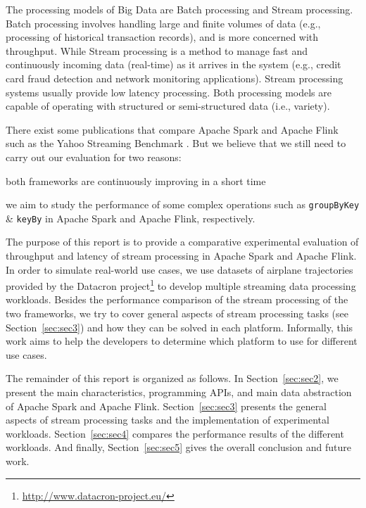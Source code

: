 \documentclass[]{article}
\begin{document}
\par The processing models of Big Data are Batch processing and Stream processing. Batch processing involves handling  large and finite volumes of data (e.g., processing of historical transaction records), and is more concerned with throughput. While Stream processing  is a method to manage fast and continuously incoming data (real-time) as it arrives in the system (e.g., credit card fraud detection and network monitoring applications). Stream processing systems usually  provide low latency processing. Both processing models are capable of operating with structured or semi-structured data (i.e., variety).

\par There exist some publications that compare Apache Spark and Apache Flink
 such as the Yahoo Streaming Benchmark \cite{yahoo}. But we believe that we still need to carry out our evaluation for two reasons: \begin{enumerate*}[label=(\roman*)]
\item both frameworks are continuously improving in a short time 
\item we aim to study the performance of some complex operations such as \texttt{groupByKey} \& \texttt{keyBy} in Apache Spark and Apache Flink, respectively.
\end{enumerate*}

 

\par The purpose of this report is to provide a comparative experimental evaluation of throughput and latency of stream processing in Apache Spark and Apache Flink. In order to simulate real-world use cases, we use datasets of airplane trajectories provided by the  Datacron project\footnote{\url{http://www.datacron-project.eu/}} to develop multiple streaming data processing workloads. Besides the performance comparison of the stream processing of the two frameworks, we try to cover general aspects of stream processing tasks (see Section~\ref{sec:sec3}) and how they can be solved in each platform. Informally,  this work aims to help the developers to determine which platform to use for different use cases. 


\par The remainder of this report is organized as follows.
In Section~\ref{sec:sec2}, we present the main characteristics, programming APIs, and main data abstraction of Apache Spark and Apache Flink. Section~\ref{sec:sec3} presents the general aspects of stream processing tasks and the implementation of experimental workloads. Section~\ref{sec:sec4}
compares the performance results of the different workloads. And finally, Section~\ref{sec:sec5} gives the overall conclusion and future work.
\end{document}
